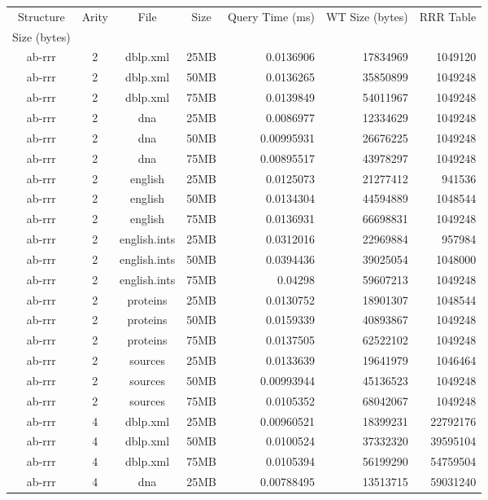 \begin{table}[h]
\begin{center}
\begin{tabular}{ccccrrr}
\toprule
Structure & Arity & File & Size & Query Time (ms) &
WT Size (bytes) & RRR Table\\ Size (bytes)\\
\midrule
ab-rrr & 2 & dblp.xml & 25MB & 0.0136906 & 17834969 & 1049120 \\
ab-rrr & 2 & dblp.xml & 50MB & 0.0136265 & 35850899 & 1049248 \\
ab-rrr & 2 & dblp.xml & 75MB & 0.0139849 & 54011967 & 1049248 \\
ab-rrr & 2 & dna & 25MB & 0.0086977 & 12334629 & 1049248 \\
ab-rrr & 2 & dna & 50MB & 0.00995931 & 26676225 & 1049248 \\
ab-rrr & 2 & dna & 75MB & 0.00895517 & 43978297 & 1049248 \\
ab-rrr & 2 & english & 25MB & 0.0125073 & 21277412 & 941536 \\
ab-rrr & 2 & english & 50MB & 0.0134304 & 44594889 & 1048544 \\
ab-rrr & 2 & english & 75MB & 0.0136931 & 66698831 & 1049248 \\
ab-rrr & 2 & english.ints & 25MB & 0.0312016 & 22969884 & 957984 \\
ab-rrr & 2 & english.ints & 50MB & 0.0394436 & 39025054 & 1048000 \\
ab-rrr & 2 & english.ints & 75MB & 0.04298 & 59607213 & 1049248 \\
ab-rrr & 2 & proteins & 25MB & 0.0130752 & 18901307 & 1048544 \\
ab-rrr & 2 & proteins & 50MB & 0.0159339 & 40893867 & 1049248 \\
ab-rrr & 2 & proteins & 75MB & 0.0137505 & 62522102 & 1049248 \\
ab-rrr & 2 & sources & 25MB & 0.0133639 & 19641979 & 1046464 \\
ab-rrr & 2 & sources & 50MB & 0.00993944 & 45136523 & 1049248 \\
ab-rrr & 2 & sources & 75MB & 0.0105352 & 68042067 & 1049248 \\
ab-rrr & 4 & dblp.xml & 25MB & 0.00960521 & 18399231 & 22792176 \\
ab-rrr & 4 & dblp.xml & 50MB & 0.0100524 & 37332320 & 39595104 \\
ab-rrr & 4 & dblp.xml & 75MB & 0.0105394 & 56199290 & 54759504 \\
ab-rrr & 4 & dna & 25MB & 0.00788495 & 13513715 & 59031240 \\

\end{tabular}
\end{center}
\end{table}
